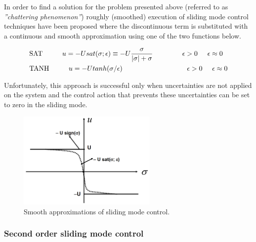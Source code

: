 \documentclass{thesisreport}
\begin{document}
In order to find a solution for the problem presented above (referred to as \textit{”chattering phenomenon”}) roughly (smoothed) execution of sliding mode control techniques have been proposed where the discontinuous  term is substituted with a  continuous and smooth approximation using one of the two functions below.


\begin{equation}
\begin{aligned}
&\text{SAT} \text{\hspace{1cm}} u=-U sat(\sigma; \epsilon) \equiv -U \frac{\sigma}{|\sigma| + \sigma} \text{\hspace{1.5cm}} \epsilon >0 \text{\hspace{0.5cm}} \epsilon \approx 0 \\
&\text{TANH} \text{\hspace{1cm}} u=-U tanh(\sigma/ \epsilon)  \text{\hspace{3.3cm}} \epsilon >0 \text{\hspace{0.5cm}} \epsilon \approx 0  \\
\end{aligned}
\end{equation}

Unfortunately, this approach is successful only when uncertainties are not applied on the system and the control action that prevents these uncertainties can be set to zero in the sliding mode.


\begin{figure}[h]
\centering
\includegraphics[width=0.6\textwidth]{Images/Control/first_order_sliding_mode_control_c}
\caption{Smooth approximations of sliding mode control. \cite{DeCarlo2008}}
\label{Smooth_Sliding_mode_control}
\end{figure}

\subsubsection{Second order sliding mode control}
\end{document}
